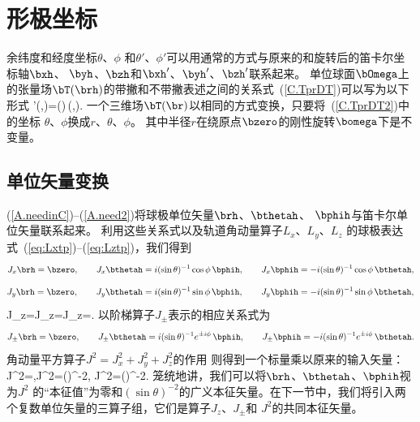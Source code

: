 \section{形极坐标}
%
\label{C.sec.canon}

余纬度和经度坐标$\theta$、$\phi$
和$\theta'$、$\phi'$可以用通常的方式与原来的和旋转后的笛卡尔坐标轴$\bxh$、 $\byh$、$\bzh$和$\bxh'$、$\byh'$、$\bzh'$联系起来。
单位球面$\bOmega$上的张量场$\bT(\brh)$的带撇和不带撇表述之间的关系式~(\ref{C.TprDT})可以写为以下形式
\eq \label{C.TprDT2}
\bT'(\theta,\phi)=\sD(\bomega)\,\bT(\theta,\phi).
\en
一个三维场$\bT(\br)$以相同的方式变换，只要将~(\ref{C.TprDT2})中的坐标 $\theta$、$\phi$换成$r$、$\theta$、$\phi$。
其中半径$r$在绕原点$\bzero$的刚性旋转$\bomega$下是不变量。

\subsection{单位矢量变换}
(\ref{A.needinC})--(\ref{A.need2})将球极单位矢量$\brh$、$\bthetah$、
$\bphih$与笛卡尔单位矢量联系起来。
利用这些关系式以及轨道角动量算子$L_x$、$L_y$、$L_z$ 的球极表达式~(\ref{eq:Lxtp})--(\ref{eq:Lztp})，我们得到
\begin{displaymath}
J_x\brh=\bzero,
\qquad
J_x\bthetah=i(\sin\theta)^{-1}\cos\phi\,\bphih,
\qquad
J_x\bphih=-i(\sin\theta)^{-1}\cos\phi\,\bthetah,
\end{displaymath}
\eq
\en
\begin{displaymath}
J_y\brh=\bzero,
\qquad
J_y\bthetah=i(\sin\theta)^{-1}\sin\phi\,\bphih,
\qquad
J_y\bphih=-i(\sin\theta)^{-1}\sin\phi\,\bthetah,
\end{displaymath}
\eq \label{C.needfin}
\en
\eq \label{C.Jpolvec}
J_z\brh=J_z\bthetah=J_z\bphih=\bzero.
\en
以阶梯算子$J_{\pm}$表示的相应关系式为
\begin{displaymath}
J_{\pm}\brh=\bzero,
\qquad
J_{\pm}\bthetah=i(\sin\theta)^{-1}e^{\pm i\phi}\,\bphih,
\qquad
J_{\pm}\bphih=-i(\sin\theta)^{-1}e^{\pm i\phi}\,\bthetah.
\end{displaymath}
\eq \label{C.Jpolvec2}
\en
角动量平方算子$J^2=J_x^2+J_y^2+J_z^2$的作用 则得到一个标量乘以原来的输入矢量：
\eq \label{C.J2polvec}
J^2\brh=\bzero,\qquad J^2\bthetah=(\sin\theta)^{-2}\bthetah,
\qquad J^2\bphih=(\sin\theta)^{-2}\bphih.
\en
笼统地讲，我们可以将$\brh$、$\bthetah$、$\bphih$视为$J^2$ 的“本征值”为零和$(\sin\theta)^{-2}$的广义本征矢量。在下一节中，我们将引入两个复数单位矢量的三算子组，它们是算子$J_z$、$J_{\pm}$和 $J^2$的共同本征矢量。

